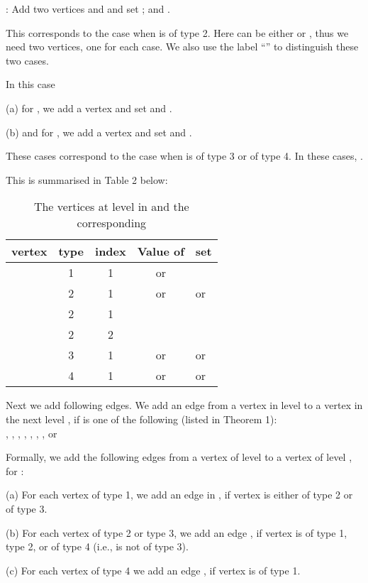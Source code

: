 \documentclass[10pt]{article}
\begin{document}
: Add two vertices
 and  and set ; 
and .

This corresponds to the case when  is of type 2. Here  can be
either  or , thus we need two vertices, one for
each case. We also use the label ``'' to distinguish these two
cases.

 In this case

\noindent (a) for , we add a vertex  and set  and
.
  
\noindent (b) and for , we add a vertex  and set  and
.  

These cases correspond to the case when  is of type 3 or of type 4.
In these cases, .
 

This is summarised in Table 2 below:
\begin{table}[h!]
\centering
\begin{tabular}{|c||c|c|c|l|}
  \hline
  vertex & type    &index  & Value of  & set  \\
  \hline \hline	
    & 1	   & 1	   &  or  &  \\
  \hline
    & 2 	   & 1	   &  or  &  or  \\
  \hline
    & 2	   & 1	   &  &  \\
  \hline
    & 2	   & 2	   &  &  \\
  \hline
    & 3	   & 1	   &  or  &  or  \\
  \hline
    & 4	   & 1	   &  or  &  or  \\
  \hline
\end{tabular}
\caption{The vertices at level  
in  and the corresponding }
\label{tab:sec}
\end{table}

Next we add following edges. We add an edge from a vertex  in level
 to a vertex  in the next level , if  is
one of the following (listed in Theorem 1):\\

, , , , , , ,  or



Formally, we add the following edges from a vertex  of level  to a
vertex  of level , for :

\noindent (a) For each vertex  of type 1, we add an edge  in , if
vertex  is either of type 2 or of type 3.
 
\noindent (b) For each vertex  of type 2 or type 3, we add an edge , if 
vertex  is of type 1, type 2, or of type 4 (i.e.,  is not of type
3).

\noindent (c) For each vertex  of type 4 we add an edge , if vertex 
is of type 1.
\end{document}
